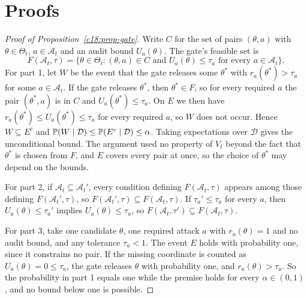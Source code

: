 \section{Proofs}

\begin{proof}[Proof of Proposition~\ref{c18:prop-gate}]
Write $C$ for the set of pairs $(\theta,a)$ with $\theta\in\Theta_t$, $a\in\mathcal A_t$ and an audit
bound $U_a(\theta)$. The gate's feasible set is
\[F(\mathcal A_t,\tau)=\{\theta\in\Theta_t:(\theta,a)\in C\text{ and }U_a(\theta)\le\tau_a\text{ for every }a\in\mathcal A_t\}.\]
For part 1, let $W$ be the event that the gate releases some $\theta^\ast$ with $r_a(\theta^\ast)>\tau_a$ for some
$a\in\mathcal A_t$. If the gate releases $\theta^\ast$, then $\theta^\ast\in F$, so for every required $a$ the pair $(\theta^\ast,a)$
is in $C$ and $U_a(\theta^\ast)\le\tau_a$. On $E$ we then have $r_a(\theta^\ast)\le U_a(\theta^\ast)\le\tau_a$ for every required $a$, so $W$ does
not occur. Hence $W\subseteq E^c$ and $\mathbb{P}(W\mid\mathcal D)\le\mathbb{P}(E^c\mid\mathcal D)\le\alpha$. Taking expectations over $\mathcal D$
gives the unconditional bound. The argument used no property of $V_t$ beyond the fact that
$\theta^\ast$ is chosen from $F$, and $E$ covers every pair at once, so the choice of $\theta^\ast$ may depend on the bounds.

For part 2, if $\mathcal A_t\subseteq\mathcal A_t'$, every condition defining $F(\mathcal A_t,\tau)$ appears among those defining
$F(\mathcal A_t',\tau)$, so $F(\mathcal A_t',\tau)\subseteq F(\mathcal A_t,\tau)$. If $\tau_a'\le\tau_a$ for every $a$, then $U_a(\theta)\le\tau_a'$ implies $U_a(\theta)\le\tau_a$,
so $F(\mathcal A_t,\tau')\subseteq F(\mathcal A_t,\tau)$.

For part 3, take one candidate $\theta$, one required attack $a$ with $r_a(\theta)=1$ and no audit bound,
and any tolerance $\tau_a<1$. The event $E$ holds with probability one, since it constrains no pair.
If the missing coordinate is counted as $U_a(\theta)=0\le\tau_a$, the gate releases $\theta$ with probability
one, and $r_a(\theta)>\tau_a$. So the probability in part 1 equals one while the premise holds for every
$\alpha\in(0,1)$, and no bound below one is possible.
\end{proof}

